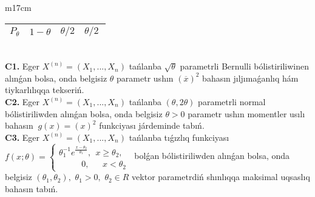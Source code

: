 \documentclass{article}
\begin{document}
\begin{tabular}{m{17cm}}
\begin{tabular}{|c|c|c|c|}
\hline
\(P_{\theta}\) & \(1 - \theta\) & \(\theta/2\) & \(\theta/2\ \) \\
\hline
\end{tabular}
 \\
\textbf{C1.} 
Eger \(X^{(n)} = \left( X_{1},...,X_{n} \right)\) tańlanba \(\sqrt{\theta}\) parametrli Bernulli bólistiriliwinen alınǵan bolsa, onda belgisiz \(\theta\) parametr ushın \((\overline{x})^{2}\) bahasın jıljımaǵanlıq hám tiykarlılıqqa tekseriń.
 \\
\textbf{C2.} 
Eger \(X^{(n)} = \left( X_{1},...,X_{n} \right)\) tańlanba \((\theta,2\theta)\) parametrli normal bólistiriliwden alınǵan bolsa, onda belgisiz \(\theta > 0\) parametr ushın momentler usılı bahasın \({\ g(x) = (x)}^{2}\) funkciyası járdeminde tabıń.
 \\
\textbf{C3.} 
Eger \(X^{(n)} = \left( X_{1},...,X_{n} \right)\) tańlanba tıǵızlıq funkciyası
$f(x;\theta) = \left\{ \begin{matrix}
\theta_{1}^{- 1}e^{\frac{x - \theta_{2}}{\theta_{1}}},\ \ x \geq \theta_{2}, \\
\ \ \ \ \ \ \ \ \ \ \ \ 0,\ \ \ \ \ \ \ x < \theta_{2}
\end{matrix} \right.\ $
bolǵan bólistiriliwden alınǵan bolsa, onda belgisiz \(\left( \theta_{1},\theta_{2} \right),\) \(\theta_{1} > 0,\) \(\theta_{2} \in R\) vektor parametrdiń shınlıqqa maksimal uqsaslıq bahasın tabıń.
 \\

\end{tabular}
\vspace{1cm}
\end{document}
